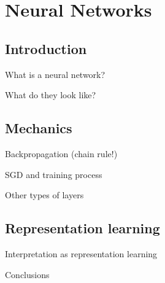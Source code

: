 
\section{Neural Networks}
\subsection{Introduction}
\begin{frame}[t]{What is a neural network?}

\end{frame}
\begin{frame}[t]{What do they look like?}

\end{frame}
\subsection{Mechanics}
\begin{frame}[t]{Backpropagation (chain rule!)}

\end{frame}
\begin{frame}[t]{SGD and training process}

\end{frame}
\begin{frame}[t]{Other types of layers}

\end{frame}
\subsection{Representation learning}
\begin{frame}[t]{Interpretation as representation learning}

\end{frame}
\begin{frame}[t]{Conclusions}

\end{frame}

